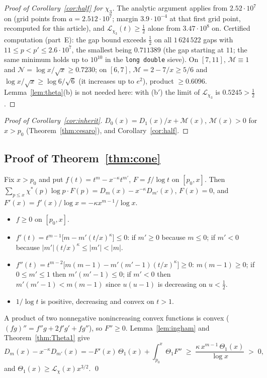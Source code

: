 \documentclass[11pt]{amsart}
\theoremstyle{definition}
\numberwithin{equation}{section}
\newcommand{\cM}{\mathcal M}          %
\newcommand{\cN}{\mathcal N}          %
\newcommand{\cL}{\mathcal L}          %
\begin{document}
\begin{proof}[Proof of Corollary~\ref{cor:half} for $\chi_3$]
The analytic argument applies from $2.52\cdot10^7$ on (grid points
from $a=2.512\cdot10^7$; margin $3.9\cdot10^{-4}$ at that first
grid point, recomputed for this article), and
$\cL_{\chi_3}(t)\ge\tfrac12$ alone from $3.47\cdot10^8$ on. Certified
computation (part~E): the gap bound exceeds $\tfrac12$ on all
$1\,624\,522$ gaps with $11\le p<p'\le2.6\cdot10^7$, the smallest
being $0.711389$ (the gap starting at $11$; the same minimum holds up
to $10^{10}$ in the \texttt{long double} sieve). On $[7,11]$,
$\cM\equiv1$ and $\cN=\log x/\sqrt x\ge0.7230$; on $[6,7]$,
$\cM=2-7/x\ge5/6$ and $\log x/\sqrt x\ge\log6/\sqrt6$ (it increases
up to $e^2$), product $\ge0.6096$. Lemma~\ref{lem:theta}(b) is not
needed here: with (b$'$) the limit of $\cL_{\chi_3}$ is
$0.5245>\tfrac12$.
\end{proof}

\begin{proof}[Proof of Corollary~\ref{cor:inherit}]
$D_0(x)=D_1(x)/x+\cM(x)$, $\cM(x)>0$ for $x>p_0$
(Theorem~\ref{thm:cesaro}), and Corollary~\ref{cor:half}.
\end{proof}

\subsection{Proof of Theorem~\ref{thm:cone}}

Fix $x>p_0$ and put $f(t)=t^m-x^{-\kappa}t^{m'}$, $F=f/\log t$ on
$[p_0,x]$. Then
$\sum_{p\le x}\chi^*(p)\log p\cdot F(p)=D_m(x)-x^{-\kappa}D_{m'}(x)$,
$F(x)=0$, and $F'(x)=f'(x)/\log x=-\kappa x^{m-1}/\log x$.
\begin{itemize}
\item $f\ge0$ on $[p_0,x]$.
\item $f'(t)=t^{m-1}\bigl[m-m'(t/x)^\kappa\bigr]\le0$: if $m'\ge0$
because $m\le0$; if $m'<0$ because $|m'|(t/x)^\kappa\le|m'|<|m|$.
\item $f''(t)=t^{m-2}\bigl[m(m-1)-m'(m'-1)(t/x)^\kappa\bigr]\ge0$:
$m(m-1)\ge0$; if $0\le m'\le1$ then $m'(m'-1)\le0$; if $m'<0$ then
$m'(m'-1)<m(m-1)$ since $u(u-1)$ is decreasing on $u<\tfrac12$.
\item $1/\log t$ is positive, decreasing and convex on $t>1$.
\end{itemize}
A product of two nonnegative nonincreasing convex functions is
convex ($(fg)''=f''g+2f'g'+fg''$), so $F''\ge0$.
Lemma~\ref{lem:ingham} and Theorem~\ref{thm:Theta1} give
\[
D_m(x)-x^{-\kappa}D_{m'}(x)=-F'(x)\,\Theta_1(x)+\int_{p_0}^x\Theta_1F''
\;\ge\;\frac{\kappa\,x^{m-1}\,\Theta_1(x)}{\log x}\;>\;0 ,
\]
and $\Theta_1(x)\ge\cL_\chi(x)x^{3/2}$. \qed
\end{document}
